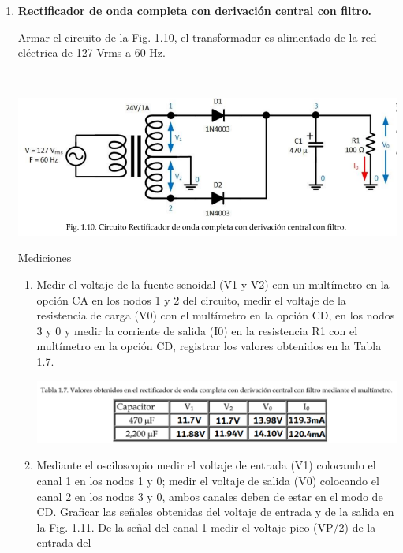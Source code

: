 \documentclass[12pt]{article}
\begin{document}
\begin{enumerate}
\begin{enumerate}
            \end{enumerate}
            \item \textbf{Rectificador de onda completa con derivación central con filtro.}\par
            Armar el circuito de la Fig. 1.10, el transformador es alimentado de la red eléctrica de 127 Vrms a
            60 Hz.\par\
            \begin{center}
                \includegraphics*[scale=0.57]{fig1-10.png}
            \end{center}
            Mediciones\par
            \begin{enumerate}
                \item Medir el voltaje de la fuente senoidal (V1 y V2) con un multímetro en la opción CA en los
                nodos 1 y 2 del circuito, medir el voltaje de la resistencia de carga (V0) con el multímetro
                en la opción CD, en los nodos 3 y 0 y medir la corriente de salida (I0) en la resistencia R1
                con el multímetro en la opción CD, registrar los valores obtenidos en la Tabla 1.7.
                \begin{center}
                    \includegraphics*[scale=0.55]{tabla1-7.png}
                \end{center}
                \item Mediante el osciloscopio medir el voltaje de entrada (V1) colocando el canal 1 en los nodos
                1 y 0; medir el voltaje de salida (V0) colocando el canal 2 en los nodos 3 y 0, ambos canales
                deben de estar en el modo de CD. Graficar las señales obtenidas del voltaje de entrada y de
                la salida en la Fig. 1.11. De la señal del canal 1 medir el voltaje pico (VP/2) de la entrada del

\end{enumerate}
\end{enumerate}
\end{document}
